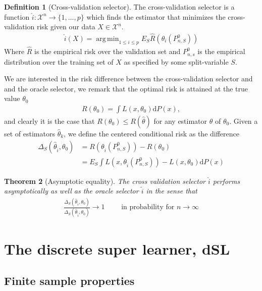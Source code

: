 \documentclass[11pt, a4paper]{article}
\DeclareMathOperator*{\argmin}{arg\,min}
\newtheorem{theorem}{Theorem}
\theoremstyle{definition}
\newtheorem{definition}[theorem]{Definition}
\theoremstyle{remark}
\begin{document}
\begin{definition}[Cross-validation selector]
    The cross-validation selector is a function $ \hat{i}: \mathcal{X}^{n} \to \{1,...,p\} $  which finds the estimator that minimizes the cross-validation risk given our data $ X \in \mathcal{X}^{n} $. 
    \begin{align*}
        \hat{i}(X) = \argmin_{1 \leq i \leq p} E_S \hat{R} (\theta_i (P_{n,S}^0 )) 
    \end{align*}
    Where $ \hat{R}  $ is the empirical risk over the validation set and $ P_{n ,s}^{0} $ is the empirical distribution over the training set of $ X $ as specified by some split-variable $ S $. 
\end{definition}
We are interested in the risk difference between the cross-validation selector and and the oracle selector, we remark that the optimal risk is attained at the true value $ \theta_0 $ 
\begin{align*}
    R(\theta_0) = \int L(x, \theta_0)  \mathrm{d}P(x),
\end{align*}
and clearly it is the case that $ R(\theta_0) \leq R( \hat{\theta}  ) $ for any estimator $ \hat{\theta} $ of $ \theta_0 $.
Given a set of estimators $ \hat{\theta}_{k} $, we define the centered conditional risk as the difference 
\begin{align*}
    \Delta_{S}( \hat{\theta}_{ \hat{i} }, \theta_0 ) &= R(\theta_{ \hat{i} }(P_{n, S}^{0})) -R(\theta_0) \\
    &= E_{S} \int L(x, \theta_{ \hat{i} }(P_{n, S}^{0})) - L(x, \theta_0) \mathrm{d}P(x) 
\end{align*}

\begin{theorem}[Asymptotic equality]
    The cross validation selector $ \hat{i}  $ performs asymptotically as well as the oracle selector $ \tilde{i} $  in the sense that 
    \begin{align*}
        \frac{\Delta_{S}( \hat{\theta}_{ \hat{i} } , \theta_0 )}{ \Delta_{S}( \hat{\theta}_{ \tilde{i} } , \theta_0) } \to 1 \qquad \text{ in probability for } n \to \infty
    \end{align*}
\end{theorem}


\section{The discrete super learner, dSL}

\subsection{Finite sample properties}
\end{document}
